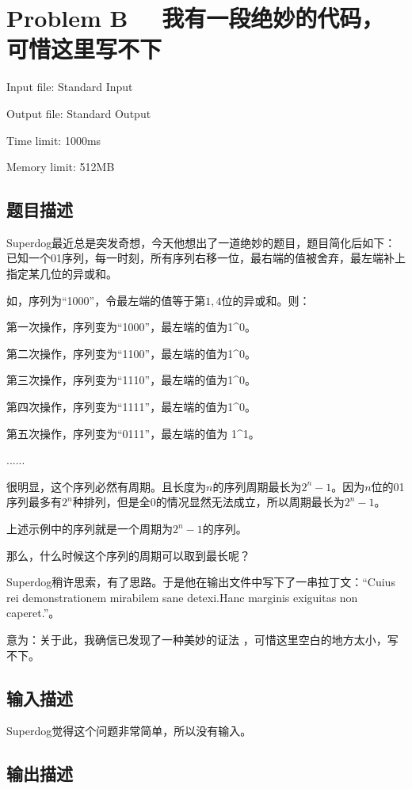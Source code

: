 \newpage
\section{Problem B \ \ 我有一段绝妙的代码，可惜这里写不下}
{ \limitfont{}
Input file: Standard Input \par
Output file: Standard Output \par
Time limit: 1000ms \par
Memory limit: 512MB \par
}
\subsection*{题目描述}

Superdog最近总是突发奇想，今天他想出了一道绝妙的题目，题目简化后如下：已知一个01序列，每一时刻，所有序列右移一位，最右端的值被舍弃，最左端补上指定某几位的异或和。

如，序列为“1000”，令最左端的值等于第$1,4$位的异或和。则：

第一次操作，序列变为“1000”，最左端的值为1\^{}0。

第二次操作，序列变为“1100”，最左端的值为1\^{}0。

第三次操作，序列变为“1110”，最左端的值为1\^{}0。

第四次操作，序列变为“1111”，最左端的值为1\^{}0。

第五次操作，序列变为“0111”，最左端的值为 1\^{}1。

......

很明显，这个序列必然有周期。且长度为$n$的序列周期最长为$2^n-1$。因为$n$位的01序列最多有$2^n$种排列，但是全0的情况显然无法成立，所以周期最长为$2^n-1$。

上述示例中的序列就是一个周期为$2^n-1$的序列。

那么，什么时候这个序列的周期可以取到最长呢？

Superdog稍许思索，有了思路。于是他在输出文件中写下了一串拉丁文：``Cuius rei demonstrationem mirabilem sane detexi.Hanc marginis exiguitas non caperet.''。

意为：关于此，我确信已发现了一种美妙的证法 ，可惜这里空白的地方太小，写不下。

\subsection*{输入描述}

Superdog觉得这个问题非常简单，所以没有输入。

\subsection*{输出描述}

